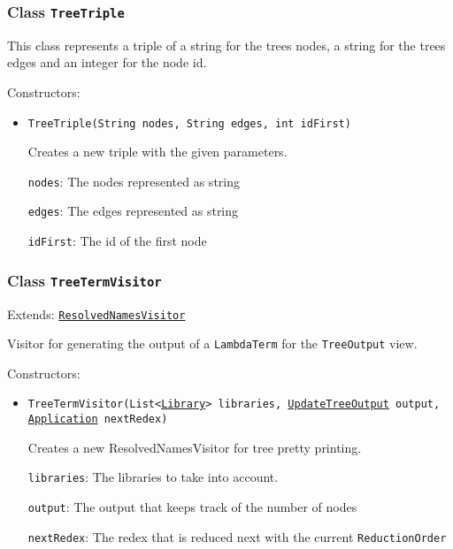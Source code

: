 \subsubsection{Class \texttt{TreeTriple}}
\label{type:edu.kit.wavelength.client.view.update.TreeTriple}
This class represents a triple of a string for the trees nodes, a string for
 the trees edges and an integer for the node id.

Constructors:
\begin{itemize}
\item \texttt{TreeTriple(String nodes, String edges, int idFirst)}

Creates a new triple with the given parameters.

\texttt{nodes}: The nodes represented as string

\texttt{edges}: The edges represented as string

\texttt{idFirst}: The id of the first node

\end{itemize}

\subsubsection{Class \texttt{TreeTermVisitor}}
\label{type:edu.kit.wavelength.client.view.update.TreeTermVisitor}
Extends: \texttt{\hyperref[type:edu.kit.wavelength.client.model.term.ResolvedNamesVisitor]{ResolvedNamesVisitor}}

Visitor for generating the output of a \texttt{LambdaTerm} for the
 \texttt{TreeOutput} view.

Constructors:
\begin{itemize}
\item \texttt{TreeTermVisitor(List<\hyperref[type:edu.kit.wavelength.client.model.library.Library]{Library}> libraries, \hyperref[type:edu.kit.wavelength.client.view.update.UpdateTreeOutput]{UpdateTreeOutput} output, \hyperref[type:edu.kit.wavelength.client.model.term.Application]{Application} nextRedex)}

Creates a new ResolvedNamesVisitor for tree pretty printing.

\texttt{libraries}: The libraries to take into account.

\texttt{output}: The output that keeps track of the number of nodes

\texttt{nextRedex}: The redex that is reduced next with the current
            \texttt{ReductionOrder}

\end{itemize}

